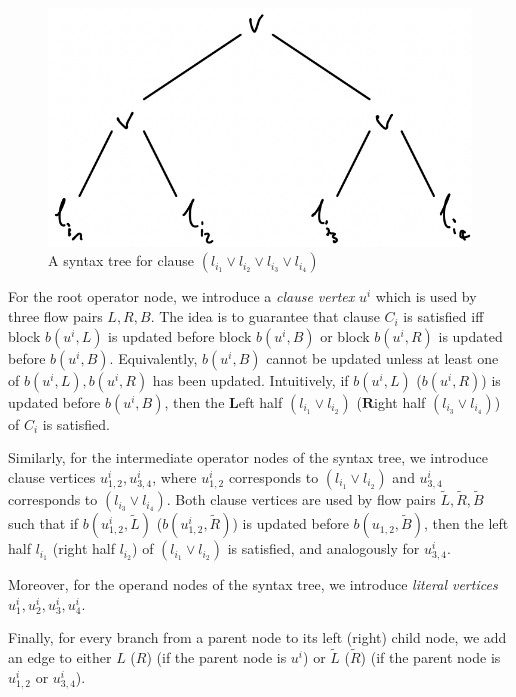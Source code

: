 \documentclass[fontsize=11pt,paper=a4]{book}
\begin{document}
\begin{figure}[htbp]
\centering
\includegraphics[width=.9\linewidth]{../assets/Screen Shot 2023-02-14 at 15.05.37.png}
\caption{\label{fig:org407a649}A syntax tree for clause \((l_{i_1}\vee l_{i_2}\vee l_{i_3}\vee l_{i_4})\)}
\end{figure}

For the root operator node, we introduce a \emph{clause vertex} \(u^i\) which is used by three flow pairs \(L,R,B\).
The idea is to guarantee that clause \(C_i\) is satisfied iff block \(b(u^i,L)\) is updated before block \(b(u^i,B)\) or block \(b(u^i,R)\) is updated before \(b(u^i,B)\).
Equivalently, \(b(u^i,B)\) cannot be updated unless at least one of \(b(u^i,L),b(u^i,R)\) has been updated.
Intuitively, if \(b(u^i,L)\) (\(b(u^i,R)\)) is updated before \(b(u^i,B)\), then the \(\textbf{L}\)eft half \((l_{i_1}\vee l_{i_2})\) (\(\textbf{R}\)ight half \((l_{i_3}\vee l_{i_4})\)) of \(C_i\) is satisfied.

Similarly, for the intermediate operator nodes of the syntax tree, we introduce clause vertices \(u_{1,2}^i,u_{3,4}^i\), where \(u_{1,2}^i\) corresponds to \((l_{i_1}\vee l_{i_2})\) and \(u_{3,4}^i\) corresponds to \((l_{i_3}\vee l_{i_4})\).
Both clause vertices are used by flow pairs \(\tilde{L},\tilde{R},\tilde{B}\) such that if \(b(u_{1,2}^i,\tilde{L})\) (\(b(u_{1,2}^i,\tilde{R})\)) is updated before \(b(u_{1,2},\tilde{B})\), then the left half \(l_{i_1}\) (right half \(l_{i_2}\)) of \((l_{i_1}\vee l_{i_2})\) is satisfied, and analogously for \(u_{3,4}^i\).

Moreover, for the operand nodes of the syntax tree, we introduce \emph{literal vertices} \(u_1^i,u_2^i,u_3^i,u_4^i\).

Finally, for every branch from a parent node to its left (right) child node, we add an edge to either \(L\) (\(R\)) (if the parent node is \(u^i\)) or \(\tilde{L}\) (\(\tilde{R}\)) (if the parent node is \(u_{1,2}^i\) or \(u_{3,4}^i\)).
\end{document}
